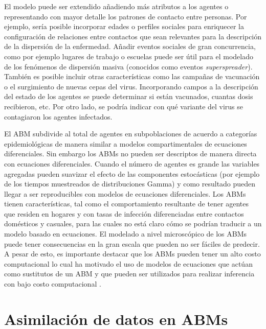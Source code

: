 El modelo puede ser extendido añadiendo más atributos a los agentes o representando con mayor detalle los patrones de contacto entre personas. Por ejemplo, sería posible incorporar edades o perfiles sociales para enriquecer la configuración de relaciones entre contactos que sean relevantes para la descripción de la dispersión de la enfermedad. Añadir eventos sociales de gran concurrencia, como por ejemplo lugares de trabajo o escuelas puede ser útil para el modelado de los fenómenos de dispersión masiva (conocidos como eventos \textit{superspreader}). También es posible incluir otras características como las campañas de vacunación o el surgimiento de nuevas cepas del virus. Incorporando campos a la descripción del estado de los agentes se puede determinar si están vacunados, cuantas dosis recibieron, etc. Por otro lado, se podría indicar con qué variante del virus se contagiaron los agentes infectados.

El ABM subdivide al total de agentes en subpoblaciones de acuerdo a categorías epidemiológicas de manera similar a modelos compartimentales de ecuaciones diferenciales. Sin embargo los ABMs no pueden ser descriptos de manera directa con ecuaciones diferenciales. Cuando el número de agentes es grande las variables agregadas pueden suavizar el efecto de las componentes estocásticas (por ejemplo de los tiempos muestreados de distribuciones Gamma) y como resultado pueden llegar a ser reproducibles con modelos de ecuaciones diferenciales. Los ABMs tienen características, tal como el comportamiento resultante de tener agentes que residen en hogares y con tasas de infección diferenciadas entre contactos domésticos y casuales, para las cuales no está claro cómo se podrían traducir a un modelo basado en ecuaciones. El modelado a nivel microscópico de los ABMs puede tener consecuencias en la gran escala que pueden no ser fáciles de predecir. A pesar de esto, es importante destacar que los ABMs pueden tener un alto costo computacional lo cual ha motivado el uso de modelos de ecuaciones que actúan como sustitutos de un ABM y que pueden ser utilizados para realizar inferencia con bajo costo computacional \citep{Hooten2020}.

\section{Asimilación de datos en ABMs}


